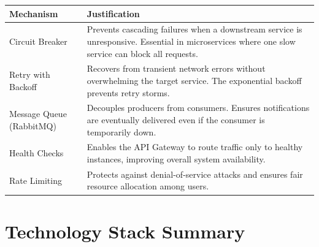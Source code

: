 \documentclass[12pt,a4paper]{article}
\begin{document}
\begin{longtable}{p{4cm}p{9cm}}
\toprule
\textbf{Mechanism} & \textbf{Justification} \\
\midrule
Circuit Breaker & Prevents cascading failures when a downstream service is unresponsive. Essential in microservices where one slow service can block all requests. \\
\midrule
Retry with Backoff & Recovers from transient network errors without overwhelming the target service. The exponential backoff prevents retry storms. \\
\midrule
Message Queue (RabbitMQ) & Decouples producers from consumers. Ensures notifications are eventually delivered even if the consumer is temporarily down. \\
\midrule
Health Checks & Enables the API Gateway to route traffic only to healthy instances, improving overall system availability. \\
\midrule
Rate Limiting & Protects against denial-of-service attacks and ensures fair resource allocation among users. \\
\bottomrule
\end{longtable}

\newpage

\section{Technology Stack Summary}
\end{document}
